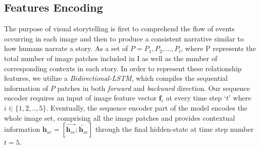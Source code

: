 \documentclass[runningheads]{llncs}
\begin{document}
\subsection{Features Encoding}
The purpose of visual storytelling is first to comprehend the flow of events occurring in each image and then to produce a consistent narrative similar to how humans narrate a story. As a set of $P = P_1, P_2, ..., P_l$, where P represents the total number of image patches included in I as well as the number of corresponding contexts in each story.
In order to represent these relationship features, we utilize a {\em Bidirectional-LSTM}, which compiles the sequential information of $P$ patches in both {\em forward} and {\em backward} direction. Our sequence encoder requires an input of image feature vector $\boldsymbol f_i$ at every time step `$t$' where $i \in \{1, 2,.., 5\}$. Eventually, the sequence encoder part of the model encodes the whole image set, comprising all the image patches and provides contextual information $\boldsymbol h_{se} = [\overrightarrow{\boldsymbol h_{se}}; \overleftarrow{\boldsymbol h_{se}}]$ through the final hidden-state at time step number $t=5$. 
\end{document}
